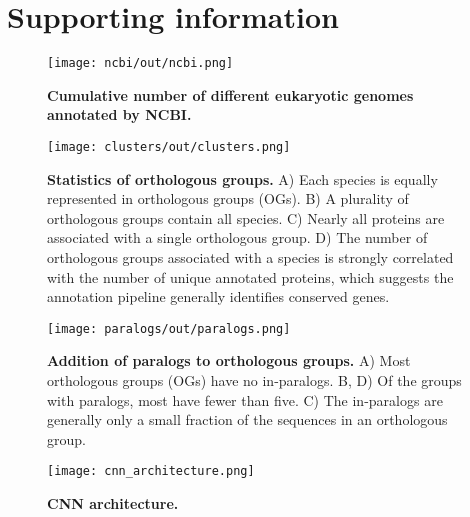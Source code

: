 \documentclass[10pt,letterpaper]{article}
\begin{document}
\printbibliography

\clearpage

\section*{Supporting information}
\setcounter{figure}{0}
\renewcommand{\thefigure}{S\arabic{figure}}

\begin{figure}[h!]
\texttt{[image: ncbi/out/ncbi.png]}
\centering
\caption{\textbf{Cumulative number of different eukaryotic genomes annotated by NCBI.}}
\label{sfig:ncbi}
\end{figure}

\begin{figure}[h!]
\texttt{[image: clusters/out/clusters.png]}
\centering
\caption{\textbf{Statistics of orthologous groups.}
A) Each species is equally represented in orthologous groups (OGs). B) A plurality of orthologous groups contain all species. C) Nearly all proteins are associated with a single orthologous group. D) The number of orthologous groups associated with a species is strongly correlated with the number of unique annotated proteins, which suggests the annotation pipeline generally identifies conserved genes.}
\label{sfig:clusters}
\end{figure}

\begin{figure}[h!]
\texttt{[image: paralogs/out/paralogs.png]}
\centering
\caption{\textbf{Addition of paralogs to orthologous groups.}
A) Most orthologous groups (OGs) have no in-paralogs. B, D) Of the groups with paralogs, most have fewer than five. C) The in-paralogs are generally only a small fraction of the sequences in an orthologous group.}
\label{sfig:paralogs}
\end{figure}

\begin{figure}[h!]
\texttt{[image: cnn\_architecture.png]}
\centering
\caption{\textbf{CNN architecture.}}
\label{sfig:cnn_architecture}
\end{figure}
\end{document}
